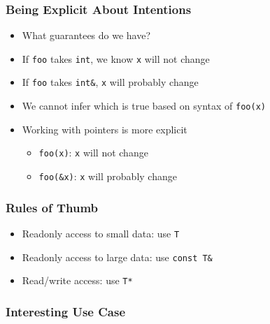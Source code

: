 \documentclass{../ucll-slides}
\begin{document}
\begin{frame}
  \frametitle{Being Explicit About Intentions}
  \begin{itemize}
    \item What guarantees do we have?
    \item If {\tt foo} takes {\tt int}, we know {\tt x} will not change
    \item If {\tt foo} takes {\tt int\&}, {\tt x} will probably change
    \item We cannot infer which is true based on syntax of {\tt foo(x)}
    \item Working with pointers is more explicit
          \begin{itemize}
            \item {\tt foo(x)}: {\tt x} will not change
            \item {\tt foo(\&x)}: {\tt x} will probably change
          \end{itemize}
  \end{itemize}
\end{frame}

\begin{frame}
  \frametitle{Rules of Thumb}
  \begin{itemize}
    \item Readonly access to small data: use {\tt T}
    \item Readonly access to large data: use {\tt const T\&}
    \item Read/write access: use {\tt T*}
  \end{itemize}  
\end{frame}

\begin{frame}
  \frametitle{Interesting Use Case}

\end{frame}
\end{document}
